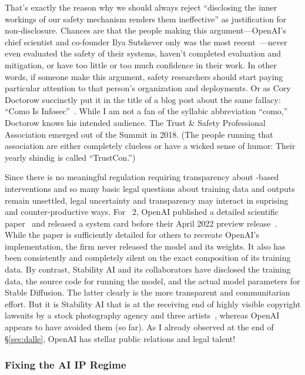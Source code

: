 That's exactly the reason why we should always reject ``disclosing
the inner workings of our safety mechanism renders them ineffective'' as
justification for non-disclosure. Chances are that the people making this
argument---OpenAI's chief scientist and co-founder Ilya Sutskever only was the
most recent~\cite{Vincent2023a}---never even evaluated the safety of their
systems, haven't completed evaluation and mitigation, or have too little or too
much confidence in their work. In other words, if someone make this argument,
safety researchers should start paying particular attention to that person's
organization and  deployments. Or as Cory Doctorow succinctly put it in the
title of a blog post about the same fallacy: ``Como Is
Infosec''~\cite{Doctorow2022}. While I am not a fan of the syllabic abbreviation
``como,'' Doctorow knows his intended audience. The Trust \& Safety Professional
Association emerged out of the  Summit in 2018. (The people running that
association are either completely clueless or have a wicked sense of humor:
Their yearly shindig is called ``TrustCon.'')

Since there is no meaningful regulation requiring transparency about -based
interventions and so many basic legal questions about training data and 
outputs remain unsettled, legal uncertainty and transparency may interact in
suprising and counter-productive ways. For \DALLE~2, OpenAI published a detailed
scientific paper~\cite{RameshDhariwalea2022} and released a system card before
their April 2022 preview release~\cite{MishkinAhmad2022}. While the paper is
sufficiently detailed for others to recreate OpenAI's implementation, the firm
never released the model and its weights. It also has been consistently and
completely silent on the exact composition of its training data. By contrast,
Stability AI and its collaborators have disclosed the training data, the source
code for running the model, and the actual model parameters for Stable
Diffusion. The latter clearly is the more transparent and communitarian effort.
But it is Stability AI that is at the receiving end of highly visible copyright
lawsuits by a stock photography agency and three
artists~\cite{Butterick2023,Setty2023}, whereas OpenAI appears to have avoided
them (so far). As I already observed at the end of \S\ref{sec:dalle}, OpenAI has
stellar public relations and legal talent!


\subsubsection{Fixing the AI IP Regime}

